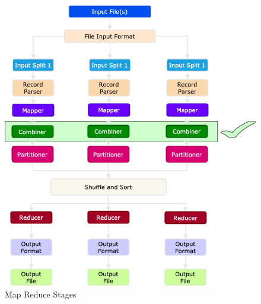 \begin{frame}
	
	\begin{figure}
		\includegraphics[height=.925\textheight]{./Figures/chapter-02/Map-Reduce-components-combiner.png}
		\caption{Map Reduce Stages } \label{fig:MRSteps2}
	\end{figure}			
\end{frame}

